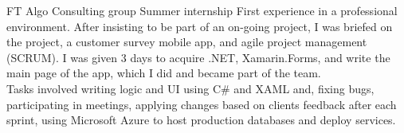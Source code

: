 \documentclass[10pt]{article} %
\begin{document}
\begin{paracol}{2}
\vspace{-\baselineskip}\medskip %

{FT} %
{Algo Consulting group} %
{Summer internship} %
{First experience in a professional environment. After insisting to be part of an on-going project, I was briefed on the project, a customer survey mobile app, and agile project management (SCRUM). I was given 3 days to acquire .NET, Xamarin.Forms, and write the main page of the app, which I did and became part of the team. \\ Tasks involved writing logic and UI using C\# and XAML and, fixing bugs, participating in meetings, applying changes based on clients feedback after each sprint, using Microsoft Azure to host production databases and deploy services.}  %


\vspace{-\baselineskip}\medskip %

\medskip %


\switchcolumn %



\end{paracol}
\end{document}
